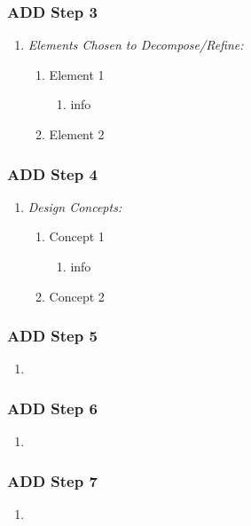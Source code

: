 \documentclass[11pt]{article}
\begin{document}
        \subsubsection{ADD Step 3}
            \begin{enumerate}
                \item \textit{Elements Chosen to Decompose/Refine:}
                    \begin{enumerate}
                        \item Element 1
                            \begin{enumerate}
                                \item info
                            \end{enumerate}
                        \item Element 2
                    \end{enumerate}
            \end{enumerate}
        \subsubsection{ADD Step 4}
            \begin{enumerate}
                \item \textit{Design Concepts:}
                    \begin{enumerate}
                        \item Concept 1
                            \begin{enumerate}
                                \item info
                            \end{enumerate}
                        \item Concept 2
                    \end{enumerate}
            \end{enumerate}
        \subsubsection{ADD Step 5}
            \begin{enumerate}
                \item \textit{}
            \end{enumerate}
        \subsubsection{ADD Step 6}
            \begin{enumerate}
                \item \textit{}
            \end{enumerate}
        \subsubsection{ADD Step 7}
            \begin{enumerate}
                \item \textit{}
            \end{enumerate}
            
\end{document}
